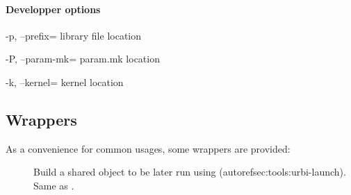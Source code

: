 \paragraph{Developper options}
\begin{options}
\item[-p, --prefix=\var{dir}] library file location
\item[-P, --param-mk=\var{file}] param.mk location
\item[-k, --kernel=\var{dir}] kernel location
\end{options}


\subsection{ Wrappers}
\label{sec:tools:umake:wrappers}

As a convenience for common  usages, some wrappers are
provided:
\begin{description}
\item[] Build a shared object to be later run
  using  (autoref{sec:tools:urbi-launch}).  Same
  as .
\end{description}

